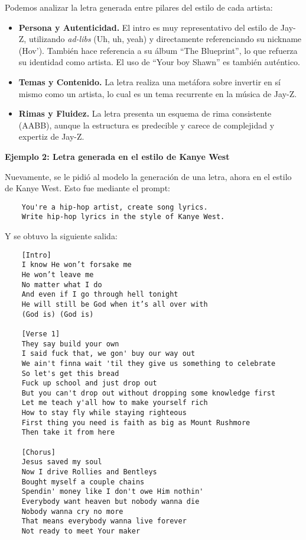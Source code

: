 \documentclass[paper=letter, fontsize=11pt, draft=false]{scrartcl}
\numberwithin{equation}{section} %
\numberwithin{figure}{section} %
\numberwithin{table}{section} %
\numberwithin{subsection}{section}
\begin{document}
Podemos analizar la letra generada entre pilares del estilo de cada artista:

\begin{itemize}
    \item \textbf{Persona y Autenticidad.} El intro es muy representativo del estilo de Jay-Z, utilizando \textit{ad-libs} (Uh, uh, yeah) y directamente referenciando su nickname (Hov'). También hace referencia a su álbum ``The Blueprint'', lo que refuerza su identidad como artista. El uso de ``Your boy Shawn'' es también auténtico.
    
    \item \textbf{Temas y Contenido.} La letra realiza una metáfora sobre invertir en sí mismo como un artista, lo cual es un tema recurrente en la música de Jay-Z.

    \item \textbf{Rimas y Fluidez.} La letra presenta un esquema de rima consistente (AABB), aunque la estructura es predecible y carece de complejidad y expertiz de Jay-Z.
\end{itemize}

\textbf{Ejemplo 2: Letra generada en el estilo de Kanye West}

Nuevamente, se le pidió al modelo la generación de una letra, ahora en el estilo de Kanye West. Esto fue mediante el prompt:

\begin{verbatim}
    You're a hip-hop artist, create song lyrics. 
    Write hip-hop lyrics in the style of Kanye West.
\end{verbatim}


Y se obtuvo la siguiente salida:

\begin{verbatim}
    [Intro]
    I know He won’t forsake me
    He won’t leave me
    No matter what I do
    And even if I go through hell tonight
    He will still be God when it’s all over with
    (God is) (God is)

    [Verse 1]
    They say build your own
    I said fuck that, we gon' buy our way out
    We ain't finna wait 'til they give us something to celebrate
    So let's get this bread
    Fuck up school and just drop out
    But you can't drop out without dropping some knowledge first
    Let me teach y'all how to make yourself rich
    How to stay fly while staying righteous
    First thing you need is faith as big as Mount Rushmore
    Then take it from here

    [Chorus]
    Jesus saved my soul
    Now I drive Rollies and Bentleys
    Bought myself a couple chains
    Spendin' money like I don't owe Him nothin'
    Everybody want heaven but nobody wanna die
    Nobody wanna cry no more
    That means everybody wanna live forever
    Not ready to meet Your maker
\end{verbatim}
\end{document}
